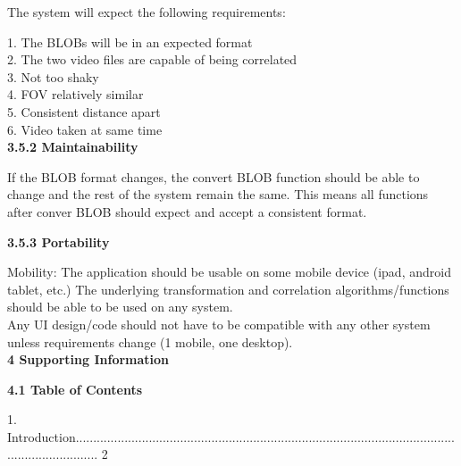 \documentclass[10pt,draftclsnofoot,onecolumn]{IEEEtran}
\begin{document}
The system will expect the following requirements:\\
\vspace{2mm}

1. The BLOBs will be in an expected format\\
2. The two video files are capable of being correlated\\
3. Not too shaky\\
4. FOV relatively similar\\
5. Consistent distance apart\\
6. Video taken at same time\\

    \vspace{5mm}
 {\Medium\textbf{3.5.2 Maintainability}} \\
     \vspace{5mm}

If the BLOB format changes, the convert BLOB function should be able to change and the rest of the system remain the same. This means all functions after conver BLOB should expect and accept a consistent format.\\
    \vspace{5mm}
    
     {\Medium\textbf{3.5.3 Portability}} \\
     \vspace{5mm}

Mobility: The application should be usable on some mobile device (ipad, android tablet, etc.)
The underlying transformation and correlation algorithms/functions should be able to be used on any system.\\
 \vspace{2mm}
Any UI design/code should not have to be compatible with any other system unless requirements change (1 mobile, one desktop).\\
    \vspace{5mm}
 {\Large\textbf{4 Supporting Information}} \\
     \vspace{5mm}

     {\Medium\textbf{4.1 Table of Contents}} \\
          \vspace{5mm}

1. Introduction....................................................................................................................................... 2\\
          \vspace{5mm}
\end{document}
